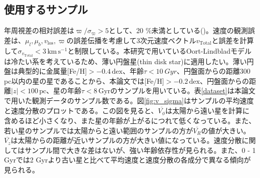 

\subsection{使用するサンプル \label{使用するサンプル}}
年周視差の相対誤差は$\varpi/\sigma_{\varpi}>5$として、20 $\%$未満としている(\cite{BJ15})。速度の観測誤差は、$\mu_l,\mu_b,v_{\mathrm{los}},\varpi$の誤差伝播を考慮して3次元速度ベクトル$v_{\mathrm{Total}}$と誤差を計算して$\sigma_{v_{\mathrm{Total}}}<3\,\mathrm{km\,s^{-1}}$と制限している。本研究で用いているOort-Lindbladモデルは冷たい系を考えているため、薄い円盤星(thin disk star)に適用したい。薄い円盤は典型的に金属量[Fe/H]$>-0.4\,\mathrm{dex}$、年齢$\tau<\SI{10}{Gyr}$、円盤面からの距離300\,pc以内の星の星であることから、本論文では[Fe/H]$>-0.2\,\mathrm{dex}$、円盤面からの距離$|z|<100\,\mathrm{pc}$、星の年齢$\tau < 8\,\mathrm{Gyr}$のサンプルを用いている。表\ref{dataset}は本論文で用いた観測データのサンプル数である。図\ref{fig:v_sigma}はサンプルの平均速度と速度分散のプロットである。この図を見ると、$\overline{V_{\phi}}$は太陽から遠い星を計算に含めるほど小さくなり、また星の年齢が上がるにつれて低くなっている。また、若い星のサンプルでは太陽からと遠い範囲のサンプルの方が$\overline{V_R}$の値が大きい。$\overline{V_z}$は太陽からの距離が近いサンプルの方が大きい値になっている。速度分散に関してはサンプル間で大きな差はないが、強い年齢依存性が見られる。また、0 - 1 Gyrでは2 Gyrより古い星と比べて平均速度と速度分散の各成分で異なる傾向が見られる。

